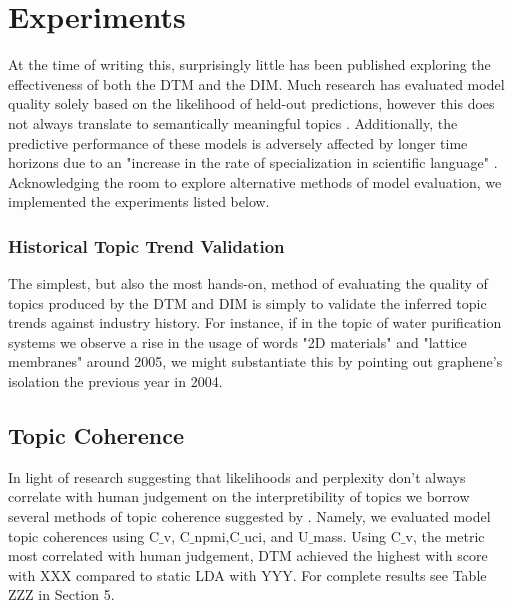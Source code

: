 
\section{Experiments}

At the time of writing this, surprisingly little has been published exploring the effectiveness of both the DTM and the DIM. Much research has evaluated model quality solely based on the likelihood of held-out predictions, however this does not always translate to semantically meaningful topics \parencite{Chang:Boyd-Graber:Wang:Gerrish:Blei-2009}. Additionally, the predictive performance of these models is adversely affected by longer time horizons due to an "increase in the rate of specialization in scientific language" \parencite{Blei:2006:DTM:1143844.1143859}. Acknowledging the room to explore alternative methods of model evaluation, we implemented the experiments listed below. 

\subsubsection{Historical Topic Trend Validation}
The simplest, but also the most hands-on, method of evaluating the quality of topics produced by the DTM and DIM is simply to validate the inferred topic trends against industry history. For instance, if in the topic of water purification systems we observe a rise in the usage of words "2D materials" and "lattice membranes" around 2005, we might substantiate this by pointing out graphene's isolation the previous year in 2004.
 

\subsection{Topic Coherence}
In light of research suggesting that likelihoods and perplexity don't always correlate with human judgement on the interpretibility of topics \parencite{Blei:2006:DTM:1143844.1143859} we borrow several methods of topic coherence suggested by \parencite{DBLP:journals/corr/RosnerHRNB14}. Namely, we evaluated model topic coherences using C$\_$v, C$\_$npmi,C$\_$uci, and U$\_$mass. Using C$\_$v, the metric most correlated with human judgement, DTM achieved the highest with score with XXX compared to static LDA with YYY. For complete results see Table ZZZ in Section 5.


